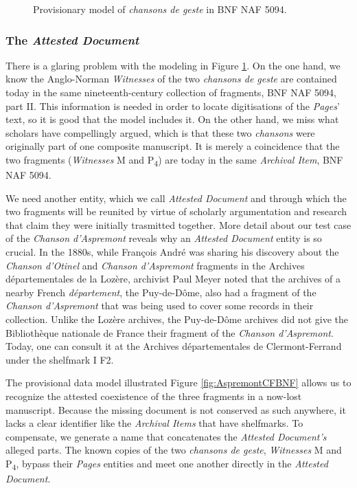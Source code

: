 \begin{figure}[ht]
    \begin{center}
        
    \end{center}
    \caption{Provisionary model of \textit{chansons de geste} in BNF NAF 5094.}
    \label{fig:BNFNAF5094}
\end{figure}

\subsubsection{The \textit{Attested Document}}

There is a glaring problem with the modeling in Figure \ref{fig:BNFNAF5094}. On the one hand, we know the Anglo-Norman \textit{Witnesses} of the two \textit{chansons de geste} are contained today in the same nineteenth-century collection of fragments, BNF NAF 5094, part II. This information is needed in order to locate digitisations of the \textit{Pages}' text, so it is good that the model includes it. On the other hand, we miss what scholars have compellingly argued, which is that these two \textit{chansons} were originally part of one composite manuscript. It is merely a coincidence that the two fragments (\textit{Witnesses} M and P\textsubscript{4}) are today in the same \textit{Archival Item}, BNF NAF 5094.

We need another entity, which we call \textit{Attested Document} and through which the two fragments will be reunited by virtue of scholarly argumentation and research that claim they were initially trasmitted together. More detail about our test case of the \textit{Chanson d'Aspremont} reveals why an \textit{Attested Document} entity is so crucial. In the 1880s, while François André was sharing his discovery about the \textit{Chanson d'Otinel} and \textit{Chanson d'Aspremont} fragments in the Archives départementales de la Lozère, archivist Paul Meyer noted that the archives of a nearby French \textit{département}, the Puy-de-Dôme, also had a fragment of the \textit{Chanson d'Aspremont} that was being used to cover some records in their collection. Unlike the Lozère archives, the Puy-de-Dôme archives did not give the Bibliothèque nationale de France their fragment of the \textit{Chanson d'Aspremont}. Today, one can consult it at the Archives départementales de Clermont-Ferrand under the shelfmark I F2.

The provisional data model illustrated Figure \ref{fig:AspremontCFBNF} allows us to recognize the attested coexistence of the three fragments in a now-lost manuscript. Because the missing document is not conserved as such anywhere, it lacks a clear identifier like the \textit{Archival Items} that have shelfmarks. To compensate, we generate a name that concatenates the \textit{Attested Document's} alleged parts. The known copies of the two \textit{chansons de geste}, \textit{Witnesses} M and P\textsubscript{4}, bypass their \textit{Pages} entities and meet one another directly in the \textit{Attested Document}.

